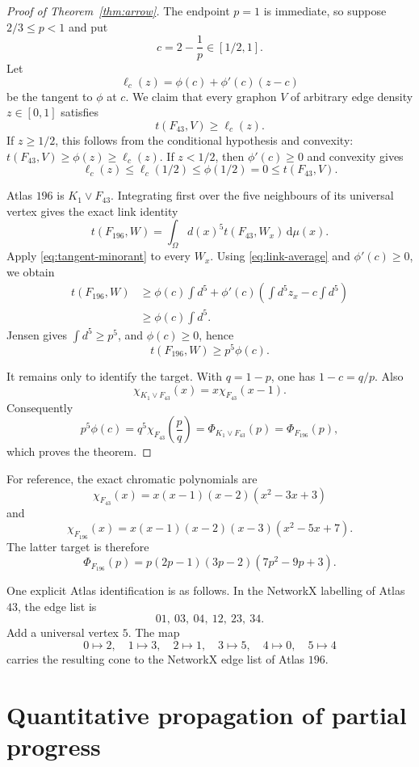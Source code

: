 \documentclass[11pt]{article}
\newcommand{\dd}{\,\mathrm d}
\begin{document}
\begin{proof}[Proof of Theorem~\ref{thm:arrow}]
The endpoint $p=1$ is immediate, so suppose $2/3\leq p<1$ and put
\[
 c=2-\frac1p\in[1/2,1].
\]
Let
\[
 \ell_c(z)=\phi(c)+\phi'(c)(z-c)
\]
be the tangent to $\phi$ at $c$.  We claim that every graphon $V$ of
arbitrary edge density $z\in[0,1]$ satisfies
\begin{equation}
 \label{eq:tangent-minorant}
 t(F_{43},V)\geq\ell_c(z).
\end{equation}
If $z\geq1/2$, this follows from the conditional hypothesis and convexity:
$t(F_{43},V)\geq\phi(z)\geq\ell_c(z)$.  If $z<1/2$, then
$\phi'(c)\geq0$ and convexity gives
\[
 \ell_c(z)\leq\ell_c(1/2)\leq\phi(1/2)=0
 \leq t(F_{43},V).
\]

Atlas $196$ is $K_1\vee F_{43}$.  Integrating first over the five
neighbours of its universal vertex gives the exact link identity
\[
 t(F_{196},W)
 =\int_\Omega d(x)^5t(F_{43},W_x)\dd\mu(x).
\]
Apply \eqref{eq:tangent-minorant} to every $W_x$.  Using
\eqref{eq:link-average} and $\phi'(c)\geq0$, we obtain
\[
\begin{split}
 t(F_{196},W)
 &\geq \phi(c)\int d^5
 +\phi'(c)\left(\int d^5z_x-c\int d^5\right)\\
 &\geq \phi(c)\int d^5.
\end{split}
\]
Jensen gives $\int d^5\geq p^5$, and $\phi(c)\geq0$, hence
\[
 t(F_{196},W)\geq p^5\phi(c).
\]

It remains only to identify the target.  With $q=1-p$, one has
$1-c=q/p$.  Also
\[
 \chi_{K_1\vee F_{43}}(x)=x\chi_{F_{43}}(x-1).
\]
Consequently
\[
 p^5\phi(c)
 =q^5\chi_{F_{43}}\!\left(\frac pq\right)
 =\Phi_{K_1\vee F_{43}}(p)
 =\Phi_{F_{196}}(p),
\]
which proves the theorem.
\end{proof}

For reference, the exact chromatic polynomials are
\[
 \chi_{F_{43}}(x)=x(x-1)(x-2)(x^2-3x+3)
\]
and
\[
 \chi_{F_{196}}(x)
 =x(x-1)(x-2)(x-3)(x^2-5x+7).
\]
The latter target is therefore
\[
 \Phi_{F_{196}}(p)
 =p(2p-1)(3p-2)(7p^2-9p+3).
\]

One explicit Atlas identification is as follows.  In the NetworkX
labelling of Atlas $43$, the edge list is
\[
 01,\ 03,\ 04,\ 12,\ 23,\ 34.
\]
Add a universal vertex $5$.  The map
\[
 0\mapsto2,\quad 1\mapsto3,\quad 2\mapsto1,\quad
 3\mapsto5,\quad 4\mapsto0,\quad 5\mapsto4
\]
carries the resulting cone to the NetworkX edge list of Atlas $196$.

\section{Quantitative propagation of partial progress}
\end{document}
